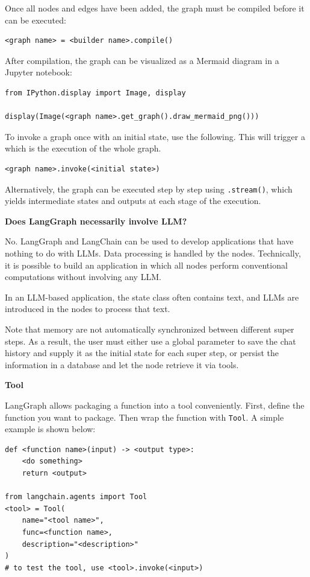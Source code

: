 Once all nodes and edges have been added, the graph must be compiled before it can be executed:
\begin{lstlisting}
<graph name> = <builder name>.compile()
\end{lstlisting}

After compilation, the graph can be visualized as a Mermaid diagram in a Jupyter notebook:
\begin{lstlisting}
from IPython.display import Image, display

display(Image(<graph name>.get_graph().draw_mermaid_png()))
\end{lstlisting}

To invoke a graph once with an initial state, use the following. This will trigger a  which is the execution of the whole graph.
\begin{lstlisting}
<graph name>.invoke(<initial state>)
\end{lstlisting}
Alternatively, the graph can be executed step by step using \verb|.stream()|, which yields intermediate states and outputs at each stage of the execution.

\begin{mdframed}
\textbf{Does LangGraph necessarily involve LLM?}

No. LangGraph and LangChain can be used to develop applications that have nothing to do with LLMs. Data processing is handled by the nodes. Technically, it is possible to build an application in which all nodes perform conventional computations without involving any LLM.

In an LLM-based application, the state class often contains text, and LLMs are introduced in the nodes to process that text.
\end{mdframed}

Note that memory are not automatically synchronized between different super steps. As a result, the user must either use a global parameter to save the chat history and supply it as the initial state for each super step, or persist the information in a database and let the node retrieve it via tools.

\vspace{0.1in}
\noindent \textbf{Tool}
\vspace{0.1in}

LangGraph allows packaging a function into a tool conveniently. First, define the function you want to package. Then wrap the function with \verb|Tool|. A simple example is shown below:
\begin{lstlisting}
def <function name>(input) -> <output type>:
    <do something>
    return <output>

from langchain.agents import Tool
<tool> = Tool(
    name="<tool name>",
    func=<function name>,
    description="<description>"
)
# to test the tool, use <tool>.invoke(<input>)
\end{lstlisting}


